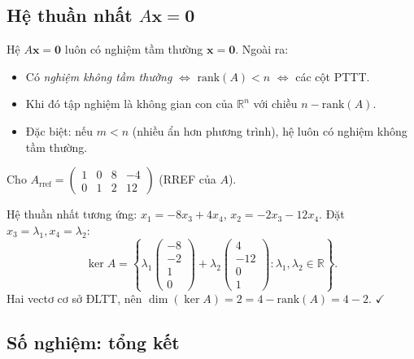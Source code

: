 \documentclass[12pt,a4paper]{article}
\begin{document}
\subsection{Hệ thuần nhất $A\mathbf{x} = \mathbf{0}$}

\begin{dinhly}[title={Hệ thuần nhất}]
Hệ $A\mathbf{x} = \mathbf{0}$ luôn có nghiệm tầm thường $\mathbf{x} = \mathbf{0}$. Ngoài ra:
\begin{itemize}
  \item Có \emph{nghiệm không tầm thường} $\Leftrightarrow$ $\mathrm{rank}(A) < n$ $\Leftrightarrow$ các cột PTTT.
  \item Khi đó tập nghiệm là không gian con của $\mathbb{R}^n$ với chiều $n - \mathrm{rank}(A)$.
  \item Đặc biệt: nếu $m < n$ (nhiều ẩn hơn phương trình), hệ luôn có nghiệm không tầm thường.
\end{itemize}
\end{dinhly}

\begin{vidu}[title={Tìm $\ker A$}]
Cho $A_{\text{rref}} = \begin{pmatrix}1&0&8&-4\\0&1&2&12\end{pmatrix}$ (RREF của $A$).

Hệ thuần nhất tương ứng: $x_1 = -8x_3 + 4x_4$, $x_2 = -2x_3 - 12x_4$. Đặt $x_3 = \lambda_1, x_4 = \lambda_2$:
\[
  \ker A = \left\{ \lambda_1\begin{pmatrix}-8\\-2\\1\\0\end{pmatrix} + \lambda_2\begin{pmatrix}4\\-12\\0\\1\end{pmatrix} : \lambda_1, \lambda_2 \in \mathbb{R}\right\}.
\]
Hai vectơ cơ sở ĐLTT, nên $\dim(\ker A) = 2 = 4 - \mathrm{rank}(A) = 4 - 2$. $\checkmark$
\end{vidu}

\subsection{Số nghiệm: tổng kết}
\end{document}
